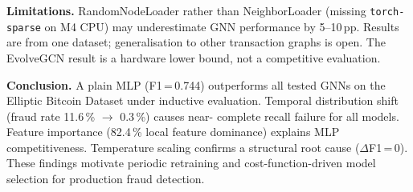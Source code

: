 \documentclass[journal,10pt,twoside]{IEEEtran}
\begin{document}
\textbf{Limitations.} RandomNodeLoader rather than NeighborLoader
(missing \texttt{torch-sparse} on M4 CPU) may underestimate GNN
performance by 5--10\,pp. Results are from one dataset; generalisation
to other transaction graphs is open. The EvolveGCN result is a hardware
lower bound, not a competitive evaluation.

\textbf{Conclusion.} A plain MLP (F1\,=\,0.744) outperforms all tested
GNNs on the Elliptic Bitcoin Dataset under inductive evaluation. Temporal
distribution shift (fraud rate 11.6\,\% $\to$ 0.3\,\%) causes near-
complete recall failure for all models. Feature importance (82.4\,\%
local feature dominance) explains MLP competitiveness. Temperature
scaling confirms a structural root cause ($\Delta$F1\,=\,0). These
findings motivate periodic retraining and cost-function-driven model
selection for production fraud detection.



\end{document}
